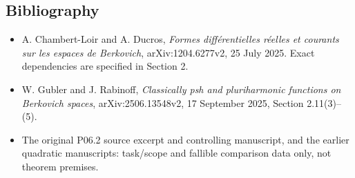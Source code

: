 \documentclass[11pt]{article}
\providecommand{\tightlist}{\setlength{\itemsep}{0pt}\setlength{\parskip}{0pt}}
\begin{document}
\subsection{Bibliography}\label{bibliography}

\begin{itemize}
\tightlist
\item
  A. Chambert-Loir and A. Ducros, \emph{Formes différentielles réelles
  et courants sur les espaces de Berkovich}, arXiv:1204.6277v2, 25 July
  2025. Exact dependencies are specified in Section 2.
\item
  W. Gubler and J. Rabinoff, \emph{Classically psh and pluriharmonic
  functions on Berkovich spaces}, arXiv:2506.13548v2, 17 September 2025,
  Section 2.11(3)--(5).
\item
  The original P06.2 source excerpt and controlling manuscript, and the
  earlier quadratic manuscripts: task/scope and fallible comparison data
  only, not theorem premises.
\end{itemize}
\end{document}
